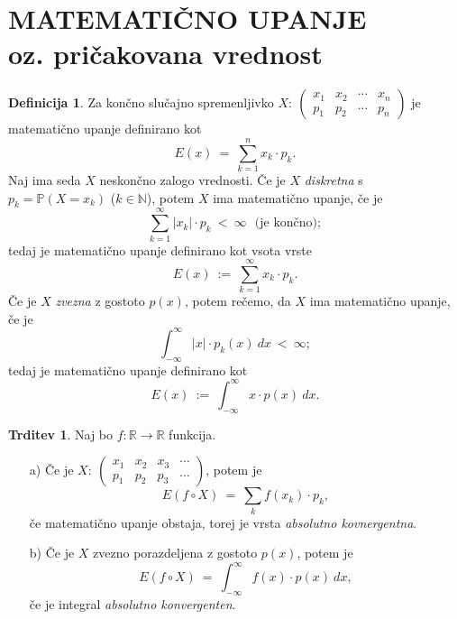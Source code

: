 \documentclass[11pt]{article}
\theoremstyle{definition}
\newtheorem{definicija}{Definicija}[section]
\theoremstyle{definition}
\newtheorem{trditev}{Trditev}[section]
\theoremstyle{definition}
\begin{document}

\section{MATEMATIČNO UPANJE \\oz. pričakovana vrednost}
\vspace{0.5cm}

\begin{definicija}

Za končno slučajno spremenljivko $X: ~\begin{pmatrix}
	x_1 & x_2 & \cdots & x_n \\
	p_1 & p_2 & \cdots & p_n
\end{pmatrix}$ je matematično upanje definirano kot 
$$E(x) ~=~ \sum_{k=1}^n x_k \cdot p_k.$$
Naj ima seda $X$ neskončno zalogo vrednosti. Če je $X$ \textit{diskretna} s $p_k = \mathbb{P}(X = x_k)$ ($k \in \mathbb{N}$), potem $X$ ima matematično upanje, če je 
$$\sum_{k=1}^{\infty} |x_k| \cdot p_k ~<~ \infty ~~~\text{(je končno)};$$
tedaj je matematično upanje definirano kot vsota vrste 
$$E(x) ~:=~ \sum_{k=1}^{\infty} x_k \cdot p_k.$$
Če je $X$ \textit{zvezna} z gostoto $p(x)$, potem rečemo, da $X$ ima matematično upanje, če je
$$\int_{-\infty}^{\infty} |x| \cdot p_k(x) ~dx ~<~ \infty;$$
tedaj je matematično upanje definirano kot
$$E(x) ~:=~ \int_{-\infty}^{\infty} x \cdot p(x) ~dx.$$

\end{definicija}
\vspace{0.5cm}

\begin{trditev}

Naj bo $f: \mathbb{R} \rightarrow \mathbb{R}$ funkcija.
\begin{enumerate}
	\item[a)] Če je $X: ~\begin{pmatrix}
	x_1 & x_2 & x_3 & \cdots \\
	p_1 & p_2 & p_3 & \cdots
\end{pmatrix}$, potem je 
	$$E(f \circ X) ~=~ \sum_k f(x_k) \cdot p_k,$$
	če matematično upanje obstaja, torej je vrsta \textit{absolutno kovnergentna}.
	\item[b)] Če je $X$ zvezno porazdeljena z gostoto $p(x)$, potem je 
	$$E(f \circ X) ~=~ \int_{-\infty}^{\infty} f(x) \cdot p(x) ~dx,$$
	če je integral \textit{absolutno konvergenten}.
\end{enumerate}

\end{trditev}
\vspace{0.5cm}
\end{document}

